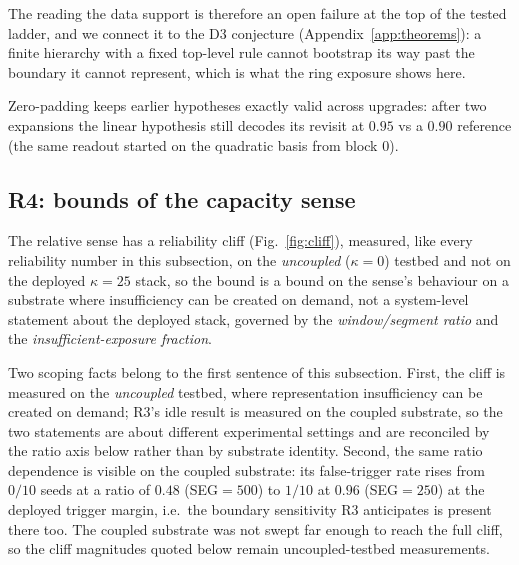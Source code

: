 \documentclass[preprint,12pt]{elsarticle}
\begin{document}
The reading the data support is therefore
an open failure at the top of
the tested ladder, and we connect it to the D3 conjecture
(Appendix~\ref{app:theorems}): a finite hierarchy with a fixed top-level rule
cannot bootstrap its way past the boundary it cannot represent, which is what
the ring exposure shows here.

Zero-padding keeps earlier hypotheses exactly
valid across
upgrades: after two expansions the linear hypothesis still decodes its
revisit at $0.95$ vs a $0.90$ reference (the same readout started on the
quadratic basis from block $0$).

\subsection{R4: bounds of the capacity sense}
\label{sec:r4}

The relative sense has a reliability cliff (Fig.~\ref{fig:cliff}), measured,
like every reliability number in this subsection, on the \emph{uncoupled}
($\kappa=0$) testbed and not on the deployed $\kappa=25$ stack, so the bound is
a bound on the sense's behaviour on a substrate where insufficiency can be
created on demand, not a system-level statement about the deployed stack,
governed by the \emph{window/segment ratio} and the
\emph{insufficient-exposure fraction}.

Two scoping facts belong to the first
sentence of this subsection. First, the cliff is measured on the
\emph{uncoupled} testbed, where representation insufficiency can be created
on demand; R3's idle result is measured on the coupled substrate, so the two
statements are about different experimental settings and are reconciled by
the ratio axis below rather than by substrate identity. Second, the same
ratio dependence is visible on the coupled substrate: its false-trigger rate
rises from $0/10$ seeds at a ratio of $0.48$ (SEG$=500$) to $1/10$ at $0.96$
(SEG$=250$) at the deployed trigger margin, i.e.\ the boundary sensitivity R3
anticipates is present there too. The coupled substrate was not swept far
enough to reach the full cliff, so the cliff magnitudes quoted below remain
uncoupled-testbed measurements.
\end{document}
